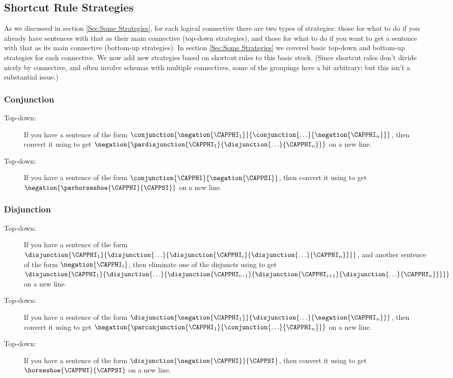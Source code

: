 \subsection{Shortcut Rule Strategies}\label{Sec:Shortcut Rule Strategies}
As we discussed in section \ref{Sec:Some Strategies}, for each logical connective there are two types of strategies: those for what to do if you already have sentences with that as their main connective (top-down strategies), and those for what to do if you want to get a sentence with that as its main connective (bottom-up strategies). 
In section \ref{Sec:Some Strategies} we covered basic top-down and bottom-up strategies for each connective.
We now add new strategies based on shortcut rules to this basic stock.
(Since shortcut rules don't divide nicely by connective, and often involve schemas with multiple connectives, some of the groupings here a bit arbitrary; but this isn't a substantial issue.)

\subsubsection*{Conjunction} 
\begin{description}
\item[ Top-down:] If you have a sentence of the form $\conjunction{\negation{\CAPPHI_1}}{\conjunction{\ldots}{\negation{\CAPPHI_{\integer{n}}}}}$, then convert it using  to get $\negation{\pardisjunction{\CAPPHI_1}{\disjunction{\ldots}{\CAPPHI_{\integer{n}}}}}$ on a new line.
\item[ Top-down:] If you have a sentence of the form $\conjunction{\CAPPHI}{\negation{\CAPPSI}}$, then convert it using  to get $\negation{\parhorseshoe{\CAPPHI}{\CAPPSI}}$ on a new line. 
\end{description} 
\subsubsection*{Disjunction} 
\begin{description}
\item[ Top-down:] If you have a sentence of the form $\disjunction{\CAPPHI_1}{\disjunction{\ldots}{\disjunction{\CAPPHI_i}{\disjunction{\ldots}{\CAPPHI_{\integer{n}}}}}}$, and another sentence of the form $\negation{\CAPPHI_i}$, then eliminate one of the disjuncts using  to get $\disjunction{\CAPPHI_1}{\disjunction{\ldots}{\disjunction{\CAPPHI_{i-1}}{\disjunction{\CAPPHI_{i+1}}{\disjunction{\ldots}{\CAPPHI_{\integer{n}}}}}}}$ on a new line.
\item[ Top-down:] If you have a sentence of the form $\disjunction{\negation{\CAPPHI_1}}{\disjunction{\ldots}{\negation{\CAPPHI_{\integer{n}}}}}$, then convert it using  to get $\negation{\parconjunction{\CAPPHI_1}{\conjunction{\ldots}{\CAPPHI_{\integer{n}}}}}$ on a new line.
\item[ Top-down:] If you have a sentence of the form $\disjunction{\negation{\CAPPHI}}{\CAPPSI}$, then convert it using  to get $\horseshoe{\CAPPHI}{\CAPPSI}$ on a new line.
\end{description} 
